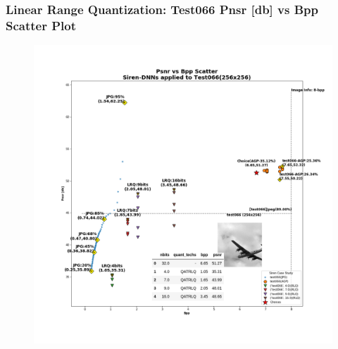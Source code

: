 \begin{frame}
    \frametitle{Linear Range Quantization: Test066 Pnsr [db] vs Bpp Scatter Plot}

    \begin{figure}
    \includegraphics[scale=0.22]{slides/experiments/quant_dataset/images/test066_jpeg_quanted_siren.png}
    \end{figure}

\end{frame}


